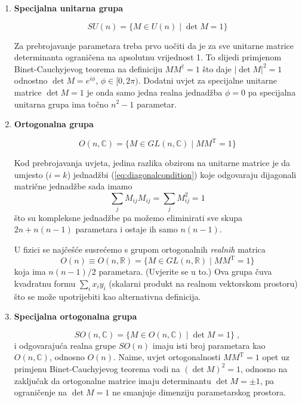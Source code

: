 \begin{enumerate}
\item \textbf{Specijalna unitarna grupa}

\begin{equation}
SU(n) = \{ M\in U(n) \; | \; \det M  = 1\}
\end{equation}

Za prebrojavanje parametara treba prvo uočiti da je za sve unitarne
matrice determinanta ograničena na apsolutnu vrijednost 1. To slijedi
primjenom Binet-Cauchyjevog teorema na definiciju $M M^{\dagger} = 1$
što daje $|\det M|^2 = 1$ odnostno $\det M = e^{i \phi}$, 
$\phi\in [0, 2\pi)$.
Dodatni uvjet za specijalne unitarne matrice $\det M = 1$ je onda
samo jedna realna jednadžba $\phi = 0$ pa specijalna unitarna grupa
ima točno $n^2 - 1$ parametar.

\item \textbf{Ortogonalna grupa}

\begin{equation}
O(n, \mathbb{C}) = \{ M\in GL(n,\mathbb{C}) \; | \; M M^{\mathrm{T}} = 1\}
\end{equation}

Kod prebrojavanja uvjeta, jedina razlika obzirom na unitarne matrice
je da umjesto ($i=k$) jednadžbi (\ref{eq:diagonalcondition}) 
koje odgovaraju dijagonali matrične jednadžbe sada imamo
\begin{equation}
 \sum_j M_{ij} M_{ij} = \sum_j M_{ij}^2 = 1
\end{equation}
što su kompleksne jednadžbe pa možemo eliminirati sve skupa
$2n + n(n-1)$ parametara i ostaje ih samo $n(n-1)$.

U fizici se najčešće susrećemo s grupom ortogonalnih \emph{realnih} matrica
\begin{equation}
O(n) \equiv O(n, \mathbb{R}) = \{ M\in GL(n,\mathbb{R}) \; | \; M M^{\mathrm{T}} = 1\}
\end{equation}
koja ima $n(n-1)/2$ parametara. (Uvjerite se u to.) Ova grupa čuva
kvadratnu formu $\sum_i x_i y_i$ (skalarni produkt na realnom
vektorskom prostoru) što se može upotrijebiti kao alternativna definicija.

\item \textbf{Specijalna ortogonalna grupa}

\begin{equation}
SO(n, \mathbb{C}) = \{ M\in O(n, \mathbb{C}) \; | \; \det M  = 1\} \;,
\end{equation}
i odgovarajuća realna grupe $SO(n)$ imaju isti broj parametara kao
$O(n, \mathbb{C})$, odnosno $O(n)$. Naime, uvjet ortogonalnosti
$M M^{\mathrm{T}} = 1$ opet uz primjenu Binet-Cauchyjevog teorema vodi
na $(\det M)^2 = 1$, odnosno
na zaključak da ortogonalne matrice imaju determinantu $\det M = \pm 1$,
pa ograničenje na $\det M = 1$ ne smanjuje dimenziju parametarskog prostora.


\end{enumerate}

